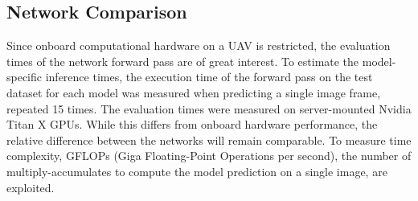 \subsection{Network Comparison} 

Since onboard computational hardware on a UAV is restricted, the evaluation times of the network forward pass are of great interest. To estimate the model-specific inference times, the execution time of the forward pass on the test dataset for each model was measured when predicting a single image frame, repeated 15 times. The evaluation times were measured on server-mounted Nvidia Titan X GPUs. While this differs from onboard hardware performance, the relative difference between the networks will remain comparable. To measure time complexity, GFLOPs (Giga Floating-Point Operations per second), the number of multiply-accumulates to compute the model prediction on a single image, are exploited.


